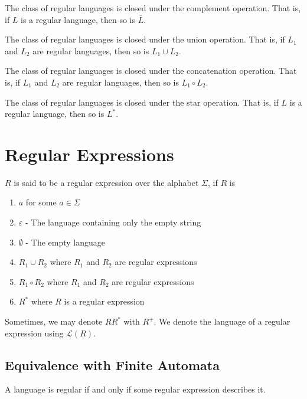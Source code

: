 \begin{proposition}
    The class of regular languages is closed under the complement operation. That is, if $L$ is a regular language, then so is $\overline{L}$.
\end{proposition}

\begin{corollary}
    The class of regular languages is closed under the union operation. That is, if $L_1$ and $L_2$ are regular languages, then so is $L_1\cup L_2$.
\end{corollary}

\begin{proposition}
    The class of regular languages is closed under the concatenation operation. That is, if $L_1$ and $L_2$ are regular languages, then so is $L_1\circ L_2$.
\end{proposition}

\begin{proposition}
    The class of regular languages is closed under the star operation. That is, if $L$ is a regular language, then so is $L^*$.
\end{proposition}

\section{Regular Expressions}
\begin{definition}
    $R$ is said to be a regular expression over the alphabet $\Sigma$, if $R$ is 
    \begin{enumerate}
        \item $a$ for some $a\in\Sigma$
        \item $\varepsilon$ - The language containing only the empty string
        \item $\emptyset$ - The empty language 
        \item $R_1\cup R_2$ where $R_1$ and $R_2$ are regular expressions 
        \item $R_1\circ R_2$ where $R_1$ and $R_2$ are regular expressions 
        \item $R^*$ where $R$ is a regular expression
    \end{enumerate}
\end{definition}

Sometimes, we may denote $RR^*$ with $R^+$. We denote the language of a regular expression using $\mathcal{L}(R)$.

\subsection{Equivalence with Finite Automata}
\begin{theorem}
    A language is regular if and only if some regular expression describes it.
\end{theorem}

